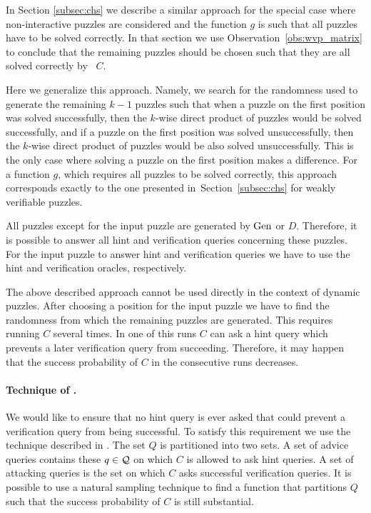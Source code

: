 In Section \ref{subsec:chs} we describe a similar approach for the special case where
non-interactive puzzles are considered and the function $g$ is such that all puzzles have to be solved correctly.
In that section we use Observation~\ref{obs:wvp_matrix} to conclude that the remaining puzzles should be chosen such that they
are all solved correctly by~ $C$.

Here we generalize this approach. Namely, we search for the randomness used to generate the remaining $k\!-\!1$ puzzles
such that when a puzzle on the first position was solved successfully, then the $k$-wise direct product of puzzles would be solved successfully,
and if a puzzle on the first position was solved unsuccessfully, then the $k$-wise direct product of puzzles would be also solved unsuccessfully.
This is the only case where solving a puzzle on the first position makes a difference.
For a function $g$, which requires all puzzles to be solved correctly, this approach corresponds
exactly to the one presented in~Section~\ref{subsec:chs} for weakly verifiable puzzles.

All puzzles except for the input puzzle are generated by $\operatorname{\text{Gen}}$ or $D$.
Therefore, it is possible to answer all hint and verification queries concerning these puzzles.
For the input puzzle to answer hint and verification queries we have to use the hint and verification oracles, respectively.

The above described approach cannot be used directly in the context of dynamic puzzles.
After choosing a position for the input puzzle we have to find the randomness from which the remaining puzzles are generated.
This requires running $C$ several times. In one of this runs $C$ can ask a hint query which prevents a later verification query from succeeding.
Therefore, it may happen that the success probability of $C$ in the consecutive runs decreases.

\paragraph{Technique of \cite{dodis2009security}.}
We would like to ensure that no hint query is ever asked that could prevent a verification query from being successful.
To satisfy this requirement we use the technique described in \cite{dodis2009security}.
The set $Q$ is partitioned into two sets. A set of advice queries contains these $q \in \mathcal{Q}$ on which
$C$ is allowed to ask hint queries. A set of attacking queries is the set on which $C$ asks successful verification queries.
It is possible to use a natural sampling technique to find a function that partitions $Q$ such that
the success probability of $C$ is still substantial.

